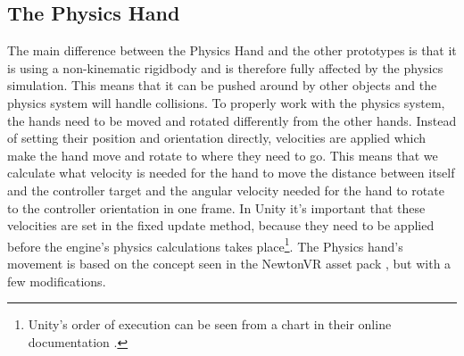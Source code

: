 \subsection{The Physics Hand}
\label{subsec:physicsHand}
The main difference between the Physics Hand and the other prototypes is that it is using a non-kinematic rigidbody and is therefore fully affected by the physics simulation. This means that it can be pushed around by other objects and the physics system will handle collisions. To properly work with the physics system, the hands need to be moved and rotated differently from the other hands. Instead of setting their position and orientation directly, velocities are applied which make the hand move and rotate to where they need to go. This means that we calculate what velocity is needed for the hand to move the distance between itself and the controller target and the angular velocity needed for the hand to rotate to the controller orientation in one frame. In Unity it's important that these velocities are set in the fixed update method, because they need to be applied before the engine's physics calculations takes place\footnote{Unity's order of execution can be seen from a chart in their online documentation \parencite{UnityExecutionOrder2017}.}. The Physics hand's movement is based on the concept seen in the NewtonVR asset pack \parencite{TomorrowTodayLabs2016}, but with a few modifications.

